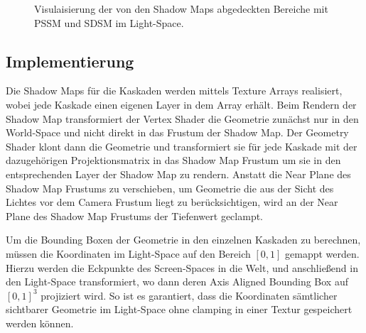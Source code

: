 \documentclass[runningheaders,a4paper]{llncs}
\begin{document}
\begin{figure}[H]
	\centering

	\caption{Visulaisierung der von den Shadow Maps abgedeckten Bereiche mit PSSM und SDSM im Light-Space.}
\end{figure}



\subsection{Implementierung}

Die Shadow Maps für die Kaskaden werden mittels Texture Arrays realisiert, wobei jede Kaskade einen eigenen Layer in dem Array erhält.
Beim Rendern der Shadow Map transformiert der Vertex Shader die Geometrie zunächst nur in den World-Space und nicht direkt in das Frustum der Shadow Map.
Der Geometry Shader klont dann die Geometrie und transformiert sie für jede Kaskade mit der dazugehörigen Projektionsmatrix in das Shadow Map Frustum um sie in den entsprechenden Layer der Shadow Map zu rendern.
Anstatt die Near Plane des Shadow Map Frustums zu verschieben, um Geometrie die aus der Sicht des Lichtes vor dem Camera Frustum liegt zu berücksichtigen, wird an der Near Plane des Shadow Map Frustums der Tiefenwert geclampt.

Um die Bounding Boxen der Geometrie in den einzelnen Kaskaden zu berechnen, müssen die Koordinaten im Light-Space auf den Bereich $[0, 1]$ gemappt werden.
Hierzu werden die Eckpunkte des Screen-Spaces in die Welt, und anschließend in den Light-Space transformiert, wo dann deren Axis Aligned Bounding Box auf $[0, 1]^3$ projiziert wird.
So ist es garantiert, dass die Koordinaten sämtlicher sichtbarer Geometrie im Light-Space ohne clamping in einer Textur gespeichert werden können.
\end{document}
